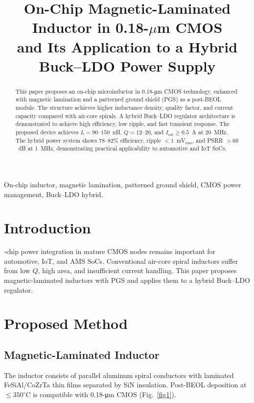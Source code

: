 \documentclass[conference]{IEEEtran}
\begin{document}
\title{On-Chip Magnetic-Laminated Inductor in 0.18-$\mu$m CMOS\\
and Its Application to a Hybrid Buck--LDO Power Supply}

\author{
}

\maketitle

\begin{abstract}
This paper proposes an on-chip microinductor in 0.18-\si{\micro\meter} CMOS technology, enhanced with magnetic lamination and a patterned ground shield (PGS) as a post-BEOL module. The structure achieves higher inductance density, quality factor, and current capacity compared with air-core spirals. A hybrid Buck--LDO regulator architecture is demonstrated to achieve high efficiency, low ripple, and fast transient response. The proposed device achieves $L=90$--$150$~nH, $Q=12$--$20$, and $I_\mathrm{sat}\geq0.5$~A at 20~MHz. The hybrid power system shows 78--82\% efficiency, ripple $<1$~mV$_\mathrm{rms}$, and PSRR $>60$~dB at 1~MHz, demonstrating practical applicability to automotive and IoT SoCs.
\end{abstract}

\begin{IEEEkeywords}
On-chip inductor, magnetic lamination, patterned ground shield, CMOS power management, Buck--LDO hybrid.
\end{IEEEkeywords}

\section{Introduction}
-chip power integration in mature CMOS nodes remains important for automotive, IoT, and AMS SoCs. Conventional air-core spiral inductors suffer from low $Q$, high area, and insufficient current handling. This paper proposes magnetic-laminated inductors with PGS and applies them to a hybrid Buck--LDO regulator.

\section{Proposed Method}
\subsection{Magnetic-Laminated Inductor}
The inductor consists of parallel aluminum spiral conductors with laminated FeSiAl/CoZrTa thin films separated by SiN insulation. Post-BEOL deposition at $\leq 350^{\circ}$C is compatible with 0.18-\si{\micro\meter} CMOS (Fig.~\ref{fig1}).
\end{document}
